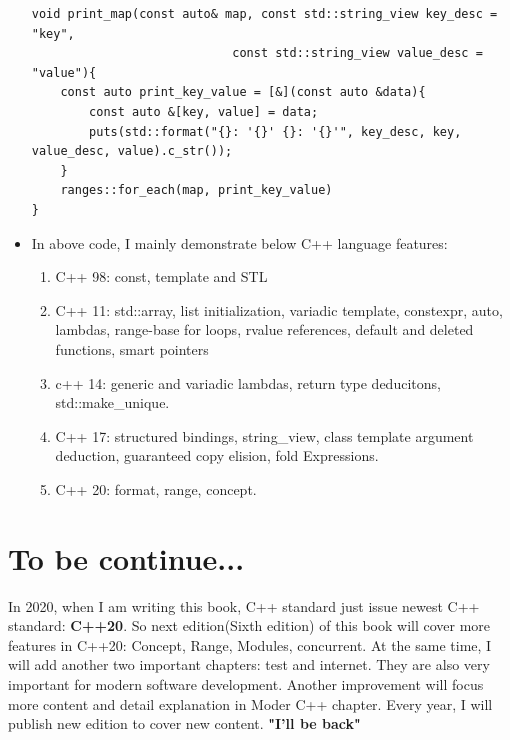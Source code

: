 \documentclass[a4paper,11pt,twoside]{book}
\begin{document}
\begin{itemize}
\begin{lstlisting}
void print_map(const auto& map, const std::string_view key_desc = "key",
							const std::string_view value_desc = "value"){
	const auto print_key_value = [&](const auto &data){
		const auto &[key, value] = data;
		puts(std::format("{}: '{}' {}: '{}'", key_desc, key, value_desc, value).c_str());
	}
	ranges::for_each(map, print_key_value)		   
}	
\end{lstlisting}	

    \item In above code, I mainly demonstrate below C++ language features:

\begin{enumerate}
    \item C++ 98: const, template and STL
    \item C++ 11: std::array, list initialization, variadic template, constexpr, auto, lambdas, range-base for loops, rvalue references, default and deleted functions, smart pointers
    \item c++ 14: generic and variadic lambdas, return type deducitons, std::make\_unique.
    \item C++ 17: structured bindings, string\_view, class template argument deduction, guaranteed copy elision, fold Expressions.
    \item C++ 20: format, range, concept. 
\end{enumerate}

\end{itemize}

\section{To be continue...}
In 2020, when I am writing this book,  C++ standard just issue newest C++ standard: \textbf{C++20}. So next edition(Sixth edition) of this book will cover more features in C++20: Concept, Range, Modules, concurrent. At the same time, I will add another two important chapters: test and internet. They are also very important for modern software development. Another improvement will focus more content and detail explanation in Moder C++ chapter. Every year, I will publish new edition to cover new content. 
\newline
\textbf{"I'll be back"}


\end{document}

